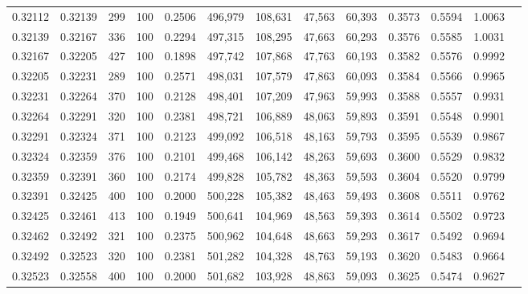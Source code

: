 \begin{tabular}{rrrrrrrrrrrrr}
0.32112 & 0.32139 &   299 & 100 &                                     0.2506 & 496,979 & 108,631 &  47,563 &  60,393 & 0.3573 & 0.5594 & 1.0063 \\
0.32139 & 0.32167 &   336 & 100 &                                     0.2294 & 497,315 & 108,295 &  47,663 &  60,293 & 0.3576 & 0.5585 & 1.0031 \\
0.32167 & 0.32205 &   427 & 100 &                                     0.1898 & 497,742 & 107,868 &  47,763 &  60,193 & 0.3582 & 0.5576 & 0.9992 \\
0.32205 & 0.32231 &   289 & 100 &                                     0.2571 & 498,031 & 107,579 &  47,863 &  60,093 & 0.3584 & 0.5566 & 0.9965 \\
0.32231 & 0.32264 &   370 & 100 &                                     0.2128 & 498,401 & 107,209 &  47,963 &  59,993 & 0.3588 & 0.5557 & 0.9931 \\
0.32264 & 0.32291 &   320 & 100 &                                     0.2381 & 498,721 & 106,889 &  48,063 &  59,893 & 0.3591 & 0.5548 & 0.9901 \\
0.32291 & 0.32324 &   371 & 100 &                                     0.2123 & 499,092 & 106,518 &  48,163 &  59,793 & 0.3595 & 0.5539 & 0.9867 \\
0.32324 & 0.32359 &   376 & 100 &                                     0.2101 & 499,468 & 106,142 &  48,263 &  59,693 & 0.3600 & 0.5529 & 0.9832 \\
0.32359 & 0.32391 &   360 & 100 &                                     0.2174 & 499,828 & 105,782 &  48,363 &  59,593 & 0.3604 & 0.5520 & 0.9799 \\
0.32391 & 0.32425 &   400 & 100 &                                     0.2000 & 500,228 & 105,382 &  48,463 &  59,493 & 0.3608 & 0.5511 & 0.9762 \\
0.32425 & 0.32461 &   413 & 100 &                                     0.1949 & 500,641 & 104,969 &  48,563 &  59,393 & 0.3614 & 0.5502 & 0.9723 \\
0.32462 & 0.32492 &   321 & 100 &                                     0.2375 & 500,962 & 104,648 &  48,663 &  59,293 & 0.3617 & 0.5492 & 0.9694 \\
0.32492 & 0.32523 &   320 & 100 &                                     0.2381 & 501,282 & 104,328 &  48,763 &  59,193 & 0.3620 & 0.5483 & 0.9664 \\
0.32523 & 0.32558 &   400 & 100 &                                     0.2000 & 501,682 & 103,928 &  48,863 &  59,093 & 0.3625 & 0.5474 & 0.9627 \\

\end{tabular}
